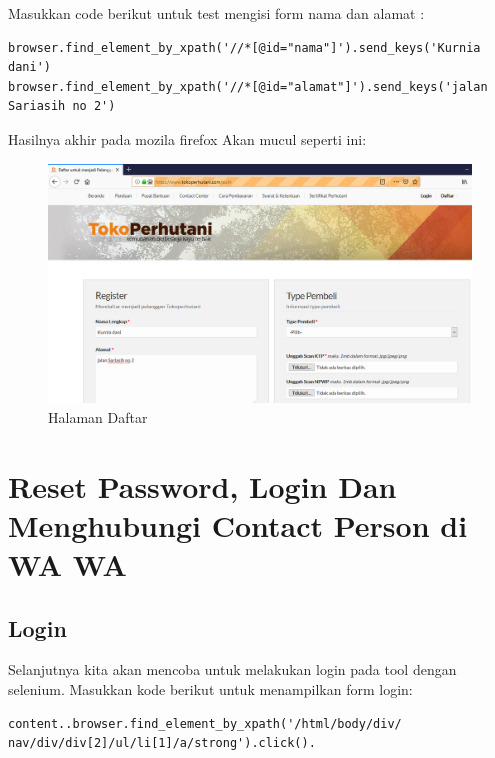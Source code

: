 Masukkan code berikut untuk test mengisi form nama dan alamat :
\begin{verbatim}
browser.find_element_by_xpath('//*[@id="nama"]').send_keys('Kurnia dani')
browser.find_element_by_xpath('//*[@id="alamat"]').send_keys('jalan Sariasih no 2')
\end{verbatim}

Hasilnya akhir pada mozila firefox Akan mucul seperti ini:
\begin{figure}[h]
	\centering
	\includegraphics[scale=0.25]{figures/4daftar}
	\caption{Halaman Daftar}
\end{figure}


















\newpage
\section{Reset Password, Login Dan Menghubungi Contact Person di WA WA}
\subsection{Login}
Selanjutnya kita akan mencoba untuk melakukan login pada tool dengan selenium. 
Masukkan kode berikut untuk menampilkan form login:
\begin{verbatim}
content..browser.find_element_by_xpath('/html/body/div/
nav/div/div[2]/ul/li[1]/a/strong').click().
\end{verbatim}



